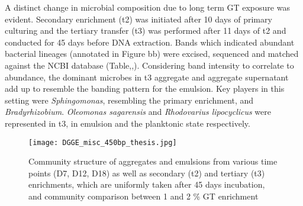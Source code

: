 \documentclass[twoside]{article}
\begin{document}
A distinct change in microbial composition due to long term GT exposure was evident. Secondary enrichment (t2) was initiated after 10 days of primary culturing and the tertiary transfer (t3) was performed after 11 days of t2 and conducted for 45 days before DNA extraction. Bands which indicated abundant bacterial lineages (annotated in Figure bb) were excised, sequenced and matched against the NCBI database (Table,,). 
Considering band intensity to correlate to abundance, the dominant microbes in t3 aggregate and aggregate supernatant add up to resemble the banding pattern for the emulsion. 
Key players in this setting were \emph{Sphingomonas}, resembling the primary enrichment, and \emph{Bradyrhizobium}. \emph{Oleomonas sagarensis} and \emph{Rhodovarius lipocyclicus} were represented in t3, in emulsion and the planktonic state respectively.

\begin{figure}
\texttt{[image: DGGE\_misc\_450bp\_thesis.jpg]}
\caption{Community structure of aggregates and emulsions from various time points (D7, D12, D18) as well as secondary (t2) and tertiary (t3) enrichments, which are uniformly taken after 45 days incubation, and community comparison between 1 and 2 \% GT enrichment}
\end{figure}
\end{document}
